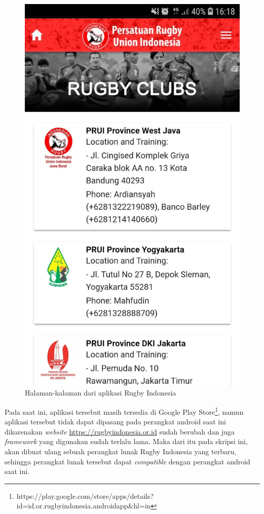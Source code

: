 \documentclass[a4paper,twoside]{article}
\begin{document}
\begin{figure} [!h]
    \includegraphics[scale=0.125]{Images/rugby_clubs.png}
    \caption[Halaman aplikasi Rugby Indonesia]{Halaman-halaman dari aplikasi Rugby Indonesia}
    \label{fig:rugby-halaman-label}
\end{figure}

Pada saat ini, aplikasi tersebut masih tersedia di Google Play Store\footnote{https://play.google.com/store/apps/details?id=id.or.rugbyindonesia.androidapp\&hl=in}, namun aplikasi tersebut tidak dapat dipasang pada perangkat android saat ini dikarenakan \textit{website} \url{https://rugbyindonesia.or.id} sudah berubah dan juga \textit{framework} yang digunakan sudah terlalu lama. Maka dari itu pada skripsi ini, akan dibuat ulang sebuah perangkat lunak Rugby Indonesia yang terbaru, sehingga perangkat lunak tersebut dapat \textit{compatible} dengan perangkat android saat ini.
\end{document}
